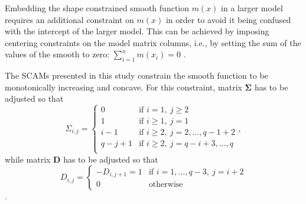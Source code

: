 Embedding the shape constrained smooth function \(m(x)\) in a larger model requires an additional constraint on \(m(x)\) in order to avoid it being confused with the intercept of the larger model.  This can be achieved by imposing centering constraints on the model matrix columns, i.e., by setting the sum of the values of the smooth to zero: \(\sum_{i = 1}^n m(x_i) = 0\) \parencite{Pya2015}.

The SCAMs presented in this study constrain the smooth function to be monotonically increasing and concave.  For this constraint, matrix \(\symbf{\Sigma}\) has to be adjusted so that
\begin{equation}
  \label{eq:SCAMSigmaMonotoneIncreasingConcave}
  \Sigma_{i, j} =
  \begin{cases}
    0 &\text{if } i = 1,~ j \geq 2 \\
    1 &\text{if } i \geq 1,~ j = 1 \\
    i - 1 &\text{if } i \geq 2,~ j = 2, \ldots, q - 1 + 2 \\
    q - j + 1 &\text{if } i \geq 2,~ j = q - i + 3, \ldots, q\\
  \end{cases},
\end{equation}
while matrix \(\symbf{D}\) has to be adjusted so that
\begin{equation}
  \label{eq:SCAMDMonotoneIncreasingConcave}
  D_{i, j} = 
  \begin{cases}
    - D_{i, j + 1} = 1 &\text{if } i = 1, \ldots, q - 3,~ j = i + 2 \\
    0 &\text{otherwise}
  \end{cases}
\end{equation}
\parencite{Pya2015}.

